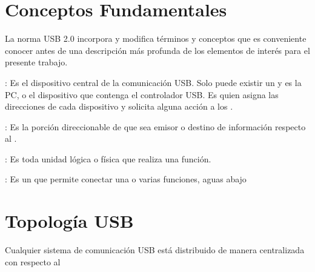   \section{Conceptos Fundamentales}
  La norma USB 2.0 incorpora y modifica términos y conceptos que es conveniente
  conocer antes de una descripción más profunda de los elementos de interés para
  el presente trabajo.
    \item {\bf \host}: Es el dispositivo central de la comunicación USB. Solo
    puede existir un \host y es la PC, o el dispositivo que contenga el
    controlador USB. Es quien asigna las direcciones de cada dispositivo y
    solicita alguna acción a los \devices.
    \item {\bf \endpoint}: Es la porción direccionable de \device que sea emisor
    o destino de información respecto al \host.
    \item {\bf \device}: Es toda unidad lógica o física que realiza una función.
    \item {\bf \hub}: Es un \device que permite conectar una o varias funciones,
    aguas abajo
    \item {\bf \functions}
    \item {\bf }
  \section{Topología USB}
  Cualquier sistema de comunicación USB está distribuido de manera centralizada
  con respecto al \host%

